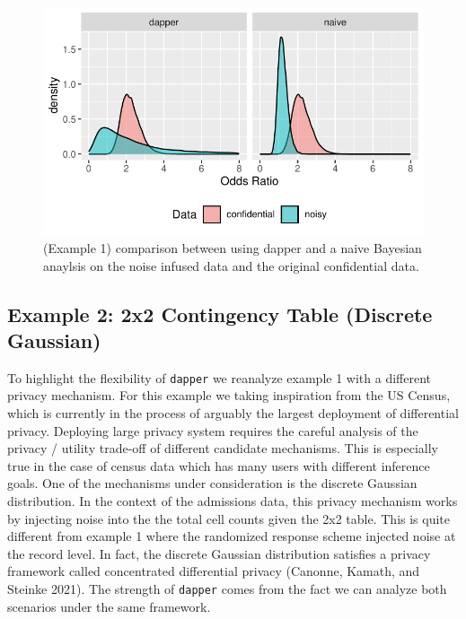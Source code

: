 \begin{figure}

{\centering \includegraphics{dppaper_files/figure-latex/post-or-compare-1} 

}

\caption{(Example 1) comparison between using dapper and a naive Bayesian anaylsis on the
noise infused data and the original confidential data.}\label{fig:post-or-compare}
\end{figure}

\hypertarget{example-2-2x2-contingency-table-discrete-gaussian}{%
\subsection{Example 2: 2x2 Contingency Table (Discrete Gaussian)}\label{example-2-2x2-contingency-table-discrete-gaussian}}

To highlight the flexibility of \texttt{dapper} we reanalyze example 1
with a different privacy mechanism. For this example we taking inspiration from the US Census,
which is currently in the process of arguably the largest deployment of differential privacy.
Deploying large privacy system requires the careful analysis
of the privacy / utility trade-off of different candidate mechanisms. This is especially
true in the case of census data which has many users with different inference goals.
One of the mechanisms under consideration is the discrete Gaussian distribution.
In the context of the admissions data, this privacy mechanism works by injecting
noise into the the total cell counts given the 2x2 table. This is quite different from
example 1 where the randomized response scheme injected noise at the record level.
In fact, the discrete Gaussian distribution satisfies a privacy framework called
concentrated differential privacy (Canonne, Kamath, and Steinke 2021).
The strength of \texttt{dapper} comes from the fact we can analyze both scenarios under the
same framework.

